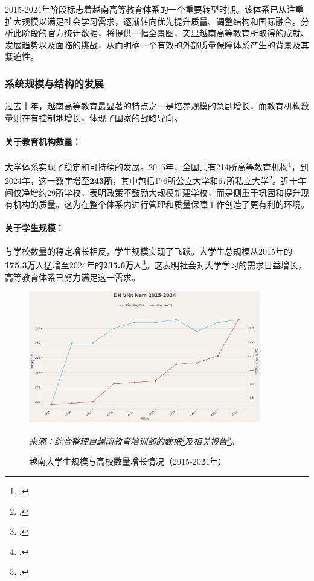 2015-2024年阶段标志着越南高等教育体系的一个重要转型时期。该体系已从注重扩大规模以满足社会学习需求，逐渐转向优先提升质量、调整结构和国际融合。分析此阶段的官方统计数据，将提供一幅全景图，突显越南高等教育所取得的成就、发展趋势以及面临的挑战，从而明确一个有效的外部质量保障体系产生的背景及其紧迫性。

\subsubsection{系统规模与结构的发展}

过去十年，越南高等教育最显著的特点之一是培养规模的急剧增长，而教育机构数量则在有控制地增长，体现了国家的战略导向。

\paragraph{关于教育机构数量：}
大学体系实现了稳定和可持续的发展。2015年，全国共有214所高等教育机构\footcite{stat_quy_mo_2015_2021}，到2024年，这一数字增至\textbf{243所}，其中包括176所公立大学和67所私立大学\footcite{stat_moet_2024}。近十年间仅净增约29所学校，表明政策不鼓励大规模新建学校，而是侧重于巩固和提升现有机构的质量。这为在整个体系内进行管理和质量保障工作创造了更有利的环境。

\paragraph{关于学生规模：}
与学校数量的稳定增长相反，学生规模实现了飞跃。大学生总规模从2015年的\textbf{175.3万}人猛增至2024年的\textbf{235.6万}人\footcite{stat_quy_mo_2015_2021}。这表明社会对大学学习的需求日益增长，高等教育体系已努力满足这一需求。

\begin{figure}
    \centering
    \includegraphics[width=0.9\textwidth]{image/bieu do 1 luan giao duc.png} 
    \caption{越南大学生规模与高校数量增长情况（2015-2024年）}
    \label{fig:quy_mo_phat_trien}
    \vspace{0.2cm}
    \footnotesize{\textit{来源：综合整理自越南教育培训部的数据\footcite{stat_moet_2024}及相关报告\footcite{stat_quy_mo_2015_2021}。}}
\end{figure}

